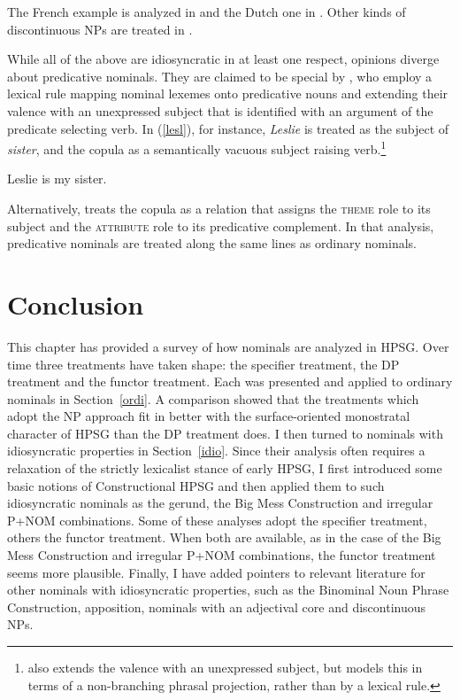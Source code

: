 \documentclass[output=paper
	        ,collection
	        ,collectionchapter
 	        ,biblatex
                ,babelshorthands
                ,newtxmath
                ,draftmode
                ,colorlinks, citecolor=brown
]{langscibook}
\begin{document}
\noindent
The French example is analyzed in \citet[20--21]{Abeilleetal04} and the Dutch one in 
\citet[47--50]{VanEynde04}. Other kinds of discontinuous NPs are treated in \citet{deKuthy2002a}. 

While all of the above are idiosyncratic in at least one respect, opinions diverge about 
predicative nominals. They are claimed to be special by \citet[409]{GS00}, who 
employ a lexical rule mapping nominal lexemes onto predicative nouns and 
extending their valence with an unexpressed subject that is identified with an argument of the 
predicate selecting verb. In (\ref{lesl}), for instance, \emph{Leslie} is treated as the subject 
of \emph{sister}, and the copula as a semantically vacuous subject raising 
verb.\footnote{\citet[225]{MuellerPredication} also extends the valence with an unexpressed subject, 
but models this in terms of a non-branching phrasal projection, rather than by a lexical rule.}   

\begin{exe} 
\ex\label{lesl}   Leslie is my sister. 
\end{exe} 
   
\noindent
Alternatively, \citet[158--163]{VanEynde15} treats the copula as a relation that assigns the \textsc{theme} 
role to its subject and the \textsc{attribute} role to its predicative complement. In that analysis, 
predicative nominals are treated along the same lines as ordinary nominals.  
  

\section{Conclusion} 


This chapter has provided a survey of how nominals are analyzed in HPSG. 
Over time three treatments have taken shape: the specifier treatment, 
the DP treatment and the functor treatment. 
Each was presented and applied to ordinary nominals in Section~\ref{ordi}. 
A comparison showed that the treatments which adopt the NP approach fit in better with 
the surface-oriented monostratal character of HPSG than the DP treatment does.
I then turned to nominals with idiosyncratic properties in Section~\ref{idio}.
Since their analysis often requires a relaxation of the strictly lexicalist stance of early HPSG, 
I first introduced some basic notions of Constructional HPSG and then applied them to 
such idiosyncratic nominals as the gerund, the Big Mess Construction and irregular P+NOM combinations.  
Some of these analyses adopt the specifier treatment, others the functor treatment. 
When both are available, as in the case of the Big Mess Construction and  
irregular P+NOM combinations, the functor treatment seems more plausible. 
Finally, I have added pointers to relevant literature for other nominals with idiosyncratic properties,
such as the Binominal Noun Phrase Construction, apposition, nominals with an adjectival core  
and discontinuous NPs. 
\end{document}
